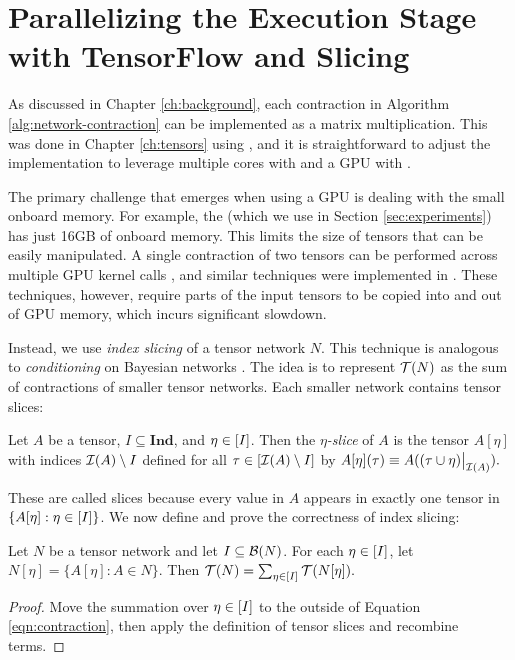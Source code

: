 \section{Parallelizing the Execution Stage with TensorFlow and Slicing}
\label{sec:parallel:execution}
As discussed in Chapter \ref{ch:background}, each contraction in Algorithm \ref{alg:network-contraction} can be implemented as a matrix multiplication.
This was done in Chapter \ref{ch:tensors} using  \cite{numpy}, and it is straightforward to adjust the implementation to leverage multiple cores with  and a GPU with  \cite{ABCCDDDGII16}.

The primary challenge that emerges when using a GPU is dealing with the small onboard memory. For example, the  (which we use in Section \ref{sec:experiments}) has just 16GB of onboard memory. This limits the size of tensors that can be easily manipulated. A single contraction of two tensors can be performed across multiple GPU kernel calls \cite{RRBSKH08}, and similar techniques were implemented in  \cite{FHZ19}. These techniques, however, require parts of the input tensors to be copied into and out of GPU memory, which incurs significant slowdown.

Instead, we use \emph{index slicing} \cite{CZHNS18,GK20,VBNHRBM19} of a tensor network $N$. This technique is analogous to \emph{conditioning} on Bayesian networks \cite{darwiche01,dechter99,pearl86,SAS94}. The idea is to represent $\mathcal{T}(N)$ as the sum of contractions of smaller tensor networks. Each smaller network contains tensor slices:

\begin{definition}
Let $A$ be a tensor, $I \subseteq \textbf{Ind}$, and $\eta \in [I]$. Then the \emph{$\eta$-slice} of $A$ is the tensor $A[\eta]$ with indices $\mathcal{I}(A) \setminus I$ defined for all $\tau \in [\mathcal{I}(A) \setminus I]$ by $A[\eta](\tau) \equiv A((\tau \cup \eta)\big|_{\mathcal{I}(A)}).$
\end{definition}

These are called slices because every value in $A$ appears in exactly one tensor in $\{ A[\eta] : \eta \in [I] \}$. We now define and prove the correctness of index slicing: 
\begin{theorem}
Let $N$ be a tensor network and let $I \subseteq \mathcal{B}(N)$. For each $\eta \in [I]$, let $N[\eta] = \{ A[\eta] : A \in N\}$. Then $\mathcal{T}(N) = \sum_{\eta \in [I]} \mathcal{T}(N[\eta]).$
\end{theorem}
\begin{proof}
Move the summation over $\eta \in [I]$ to the outside of Equation \ref{eqn:contraction}, then apply the definition of tensor slices and recombine terms.
\end{proof}

